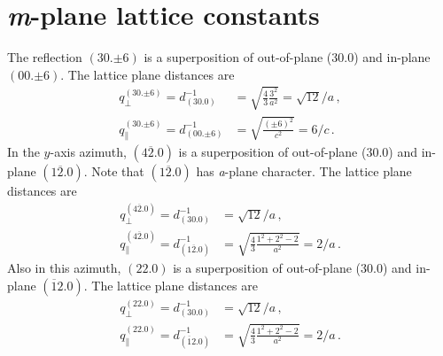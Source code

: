 \section{\textit{m}-plane lattice constants}
\label{Sec:App_Calc_mPlane}
The reflection $(30.{\pm6})$ is a superposition of out-of-plane (30.0) and in-plane $(00.{\pm6})$.
The lattice plane distances are
\begin{align}
    q_\perp^{(30.{\pm6})}=
    d_{(30.0)}^{-1} &=
    \sqrt{\frac{4}{3}\frac{3^2}{a^2}}
    =\sqrt{12}/a\,,\\
    q_\parallel^{(30.{\pm6})}=
    d_{(00.{\pm6})}^{-1} &=
    \sqrt{\frac{(\pm6)^2}{c^2}}
    =6/c\,.
\end{align}
In the $y$-axis azimuth, $(4\overline{2}.0)$ is a superposition of out-of-plane (30.0) and in-plane $(1\overline{2}.0)$.
Note that $(1\overline{2}.0)$ has \textit{a}-plane character.
The lattice plane distances are
\begin{align}
    q_\perp^{(4\overline{2}.0)}=
    d_{(30.0)}^{-1} &= \sqrt{12}/a\,,\\
    q_\parallel^{(4\overline{2}.0)}=
    d_{(1\overline{2}.0)}^{-1} &=
    \sqrt{\frac{4}{3}\frac{1^2+2^2-2}{a^2}}
    = 2/a\,.
\end{align}
Also in this azimuth, $(22.0)$ is a superposition of out-of-plane (30.0) and in-plane $(\overline{1}2.0)$.
The lattice plane distances are
\begin{align}
    q_\perp^{(22.0)}=
    d_{(30.0)}^{-1} &= \sqrt{12}/a\,,\\
    q_\parallel^{(22.0)}=
    d_{(\overline{1}2.0)}^{-1} &=
    \sqrt{\frac{4}{3}\frac{1^2+2^2-2}{a^2}}
    = 2/a\,.
\end{align}

